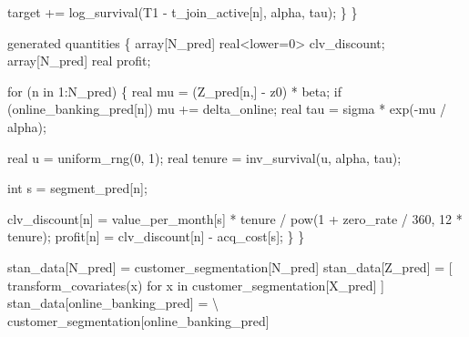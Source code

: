 \documentclass[
  letterpaper,
  DIV=11,
  numbers=noendperiod]{scrartcl}
\newenvironment{Shaded}{\begin{snugshade}}{\end{snugshade}}
\newcommand{\ControlFlowTok}[1]{\textcolor[rgb]{0.00,0.23,0.31}{#1}}
\newcommand{\DataTypeTok}[1]{\textcolor[rgb]{0.68,0.00,0.00}{#1}}
\newcommand{\DecValTok}[1]{\textcolor[rgb]{0.68,0.00,0.00}{#1}}
\newcommand{\KeywordTok}[1]{\textcolor[rgb]{0.00,0.23,0.31}{#1}}
\newcommand{\NormalTok}[1]{\textcolor[rgb]{0.00,0.23,0.31}{#1}}
\newcommand{\OperatorTok}[1]{\textcolor[rgb]{0.37,0.37,0.37}{#1}}
\newcommand{\StringTok}[1]{\textcolor[rgb]{0.13,0.47,0.30}{#1}}
\begin{document}
\begin{codelisting}
\begin{Shaded}
\begin{Highlighting}[]
    \KeywordTok{target +=}\NormalTok{ log\_survival(T1 {-} t\_join\_active[n], alpha, tau);}
\NormalTok{  \}}
\NormalTok{\}}

\KeywordTok{generated quantities}\NormalTok{ \{}
  \DataTypeTok{array}\NormalTok{[N\_pred] }\DataTypeTok{real}\NormalTok{\textless{}}\KeywordTok{lower}\NormalTok{=}\DecValTok{0}\NormalTok{\textgreater{} clv\_discount;}
  \DataTypeTok{array}\NormalTok{[N\_pred] }\DataTypeTok{real}\NormalTok{ profit;}

  \ControlFlowTok{for}\NormalTok{ (n }\ControlFlowTok{in} \DecValTok{1}\NormalTok{:N\_pred) \{}
    \DataTypeTok{real}\NormalTok{ mu = (Z\_pred[n,] {-} z0) * beta;}
    \ControlFlowTok{if}\NormalTok{ (online\_banking\_pred[n])}
\NormalTok{      mu += delta\_online;}
    \DataTypeTok{real}\NormalTok{ tau = sigma * exp({-}mu / alpha);}

    \DataTypeTok{real}\NormalTok{ u = uniform\_rng(}\DecValTok{0}\NormalTok{, }\DecValTok{1}\NormalTok{);}
    \DataTypeTok{real}\NormalTok{ tenure = inv\_survival(u, alpha, tau);}

    \DataTypeTok{int}\NormalTok{ s = segment\_pred[n];}

\NormalTok{    clv\_discount[n] = value\_per\_month[s] * tenure /}
\NormalTok{                      pow(}\DecValTok{1}\NormalTok{ + zero\_rate / }\DecValTok{360}\NormalTok{, }\DecValTok{12}\NormalTok{ * tenure);}
\NormalTok{    profit[n] = clv\_discount[n] {-} acq\_cost[s];}
\NormalTok{  \}}
\NormalTok{\}}
\end{Highlighting}
\end{Shaded}

\end{codelisting}

\begin{Shaded}
\begin{Highlighting}[]
\NormalTok{stan\_data[}\StringTok{\textquotesingle{}N\_pred\textquotesingle{}}\NormalTok{] }\OperatorTok{=}\NormalTok{ customer\_segmentation[}\StringTok{\textquotesingle{}N\_pred\textquotesingle{}}\NormalTok{]}
\NormalTok{stan\_data[}\StringTok{\textquotesingle{}Z\_pred\textquotesingle{}}\NormalTok{] }\OperatorTok{=}\NormalTok{ [ transform\_covariates(x)}
                        \ControlFlowTok{for}\NormalTok{ x }\KeywordTok{in}
\NormalTok{                        customer\_segmentation[}\StringTok{\textquotesingle{}X\_pred\textquotesingle{}}\NormalTok{] ]}
\NormalTok{stan\_data[}\StringTok{\textquotesingle{}online\_banking\_pred\textquotesingle{}}\NormalTok{] }\OperatorTok{=} \OperatorTok{\textbackslash{}}
\NormalTok{  customer\_segmentation[}\StringTok{\textquotesingle{}online\_banking\_pred\textquotesingle{}}\NormalTok{]}
\end{Highlighting}
\end{Shaded}
\end{document}
